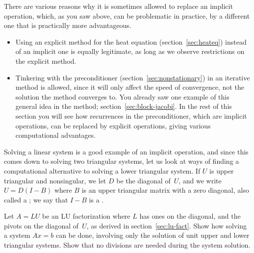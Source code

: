 There are various reasons why it is sometimes allowed to replace an
implicit operation, which, as you saw above, can be problematic in
practice, by a different one that is practically more advantageous.
\begin{itemize}
\item Using an explicit method for the heat equation
  (section~\ref{sec:heateq}) instead of an implicit one is equally
  legitimate, as long as we observe  restrictions
  on the explicit method.
\item Tinkering with the preconditioner
  (section~\ref{sec:nonstationary}) in an iterative method is allowed,
  since it will only affect the speed of convergence, not the solution
  the method converges to. You already saw one example of this general
  idea in the  method;
  section~\ref{sec:block-jacobi}. In the rest of this section you will
  see how recurrences in the preconditioner, which are implicit
  operations, can be replaced by explicit operations, giving various
  computational advantages.
\end{itemize}

Solving a linear system is a good example of an implicit operation,
and since this comes down to solving two triangular systems, let us
look at ways of finding a computational alternative to solving a lower
triangular system. If $U$ is upper triangular and nonsingular, we let
$D$ be the diagonal of~$U$, and we write $U=D(I-B)$ where $B$ is an
upper triangular matrix with a zero diagonal, also called a
; we say that $I-B$ is
a .

\begin{exercise}
  Let $A=LU$ be an LU factorization where $L$ has ones on the
  diagonal, and the pivots on the diagonal of~$U$,
  as derived in section~\ref{sec:lu-fact}.
  Show how solving a system $Ax=b$ can be done, involving
  only the solution of unit upper and lower triangular systems. Show
  that no divisions are needed during the system solution.
\end{exercise}


